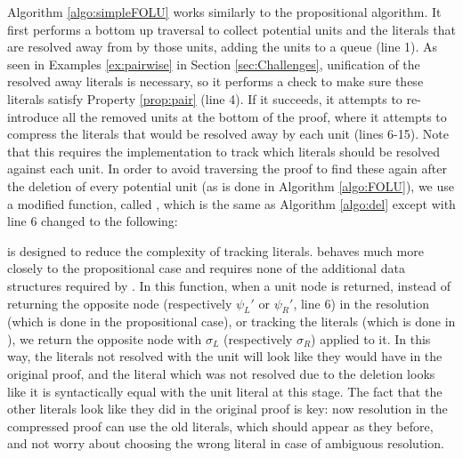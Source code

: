 Algorithm \ref{algo:simpleFOLU} works similarly to the propositional algorithm.  It first performs a bottom up traversal to collect potential units and the literals that are resolved away from by those units, adding the units to a queue (line 1). As seen in Examples \ref{ex:pairwise} in Section \ref{sec:Challenges}, unification of the resolved away literals is necessary, so it performs a check to make sure these literals satisfy Property \ref{prop:pair} (line 4). If it succeeds, it attempts to re-introduce all the removed units at the bottom of the proof, where it attempts to compress the literals that would be resolved away by each unit (lines 6-15). Note that this requires the implementation to track which literals should be resolved against each unit. In order to avoid traversing the proof to find these again after the deletion of every potential unit (as is done in Algorithm \ref{algo:FOLU}), we use a modified  function, called , which is the same as Algorithm \ref{algo:del} except with line 6 changed to the following:


 is designed to reduce the complexity of tracking literals.  behaves much more closely to the propositional case and requires none of the additional data structures required by . In this function, when a unit node is returned, instead of returning the opposite node (respectively $\psi_L'$ or $\psi_R'$, line 6) in the resolution (which is done in the propositional case), or tracking the literals (which is done in ), we return the opposite node with $\sigma_L$ (respectively $\sigma_R$) applied to it. In this way, the literals not resolved with the unit will look like they would have in the original proof, and the literal which was not resolved due to the deletion looks like it is syntactically equal with the unit literal at this stage. The fact that the other literals look like they did in the original proof is key: now resolution in the compressed proof can use the old literals, which should appear as they before, and not worry about choosing the wrong literal in case of ambiguous resolution.


